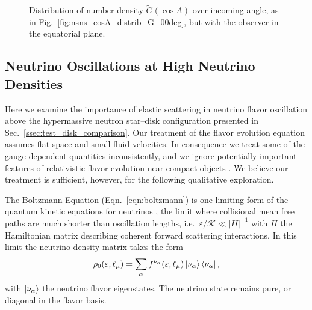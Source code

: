 \documentclass[aps,floatfix,prd,superscriptaddress,twocolumn]{revtex4-1}
\begin{document}
\begin{figure}
  \resizebox{\columnwidth}{!}{}
  \caption{Distribution of number density $\tilde{G}(\cos A)$ over incoming angle,
    as in Fig.~\ref{fig:nsns_cosA_distrib_G_00deg},
    but with the observer in the equatorial plane.}
  \label{fig:nsns_cosA_distrib_G_90deg}
\end{figure}

\subsection{Neutrino Oscillations at High Neutrino Densities}
\label{ssec:V_nunu}
Here we examine the importance of elastic scattering in neutrino
flavor oscillation above the hypermassive neutron star--disk configuration
presented in Sec.~\ref{ssec:test_disk_comparison}.
Our treatment of the flavor evolution equation assumes flat space and small fluid
velocities.
In consequence we treat some of the gauge-dependent quantities inconsistently,
and we ignore potentially important features of relativistic flavor evolution
near compact objects \cite{yang2017-gr_nu_oscillations}.
We believe our treatment is sufficient, however, for the following qualitative
exploration.

The Boltzmann Equation (Eqn.~\ref{eqn:boltzmann}) is one limiting
form of the quantum kinetic equations for neutrinos
\cite{vlas2014-neutrino_qkes},
the limit where collisional mean free paths are much shorter
than oscillation lengths, i.e.\ $\varepsilon/\mathscr{K} \ll |H|^{-1}$ with
$H$ the Hamiltonian matrix describing coherent forward scattering interactions.
In this limit the neutrino density matrix takes the form
\begin{equation}
  \label{eqn:density_rho_0}
  \rho_0(\varepsilon,\ell_\mu) =
  \sum\limits_{\alpha}f^{\nu_\alpha}(\varepsilon,\ell_\mu)
  \ket{\nu_\alpha} \bra{\nu_\alpha},
\end{equation}
with $\ket{\nu_\alpha}$ the neutrino flavor eigenstates.
The neutrino state remains pure, or diagonal in the flavor basis.
\end{document}
